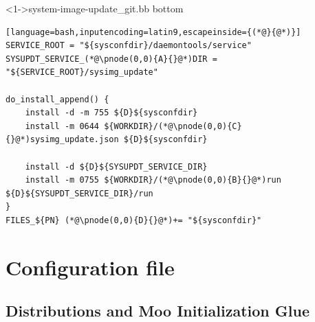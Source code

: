\documentclass[ngerman,xcolor={table,dvipsnames},smaller,compress,hyperref={bookmarks,colorlinks}]{beamer}%
\begin{document}
\begin{frame}[t,fragile]

\begin{block}<1->{system-image-update\_git.bb bottom}
\scriptsize
\begin{lstlisting}[language=bash,inputencoding=latin9,escapeinside={(*@}{@*)}]
SERVICE_ROOT = "${sysconfdir}/daemontools/service"
SYSUPDT_SERVICE_(*@\pnode(0,0){A}{}@*)DIR = "${SERVICE_ROOT}/sysimg_update"

do_install_append() {
    install -d -m 755 ${D}${sysconfdir}
    install -m 0644 ${WORKDIR}/(*@\pnode(0,0){C}{}@*)sysimg_update.json ${D}${sysconfdir}

    install -d ${D}${SYSUPDT_SERVICE_DIR}
    install -m 0755 ${WORKDIR}/(*@\pnode(0,0){B}{}@*)run ${D}${SYSUPDT_SERVICE_DIR}/run
}
FILES_${PN} (*@\pnode(0,0){D}{}@*)+= "${sysconfdir}"
\end{lstlisting}
\end{block}

\begin{itemize}
\end{itemize}



\end{frame}

\section{Configuration file}

\subsection{Distributions and Moo Initialization Glue}
\end{document}
